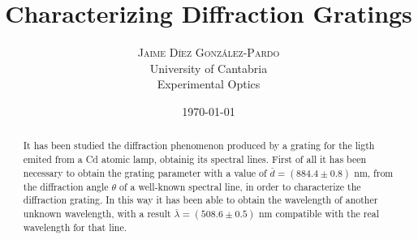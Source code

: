 \documentclass[twoside]{article}
\title{
	\vspace{-15mm}
	\fontsize{28pt}{10pt}
	\selectfont\textbf{Characterizing Diffraction Gratings}%
}
\author{
	\large
	\textsc{Jaime Díez González-Pardo}\\[4mm]%
	\fontsize{28pt}{10pt} University of Cantabria \\ %
	\normalsize Experimental Optics \\ 
}
\date{ \today }
\begin{document}
	\maketitle %


	\thispagestyle{fancy} %


	\begin{abstract}

		\noindent%

		It has been studied the diffraction phenomenon produced by a grating for the ligth emited from a Cd atomic lamp, obtainig its spectral lines. First of all it has been necessary to obtain the grating parameter with a value of $\bar{d} = (884.4 \pm 0.8) \textrm{ nm}$, from the diffraction angle $\theta$ of a well-known spectral line, in order to characterize the diffraction grating. In this way it has been able to obtain the wavelength of another unknown wavelength, with a result $\bar{\lambda} = (508.6 \pm 0.5) \textrm{ nm}$ compatible with the real wavelength for that line. 

	\end{abstract}

\end{document}
